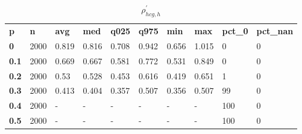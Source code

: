 \begin{table}[h]
 \centering 
\footnotesize
\caption{$\rho_{hcg,h}^\prime $}
\label{tab:alphahcgh}
\begin{tabular}[h]{| l l l l l l l l l l|
    } \hline
\textbf{ p} & \textbf{ n} & \textbf{ avg} & \textbf{ med} & \textbf{ q025} & \textbf{ q975} & \textbf{ min} & \textbf{ max} & \textbf{ pct\_0} & \textbf{ pct\_nan}
           \\
  \textbf{  0} & 2000 & 0.819 & 0.816 & 0.708 & 0.942 & 0.656 & 1.015 &   0 & 0
           \\
  \textbf{0.1} & 2000 & 0.669 & 0.667 & 0.581 & 0.772 & 0.531 & 0.849 &   0 & 0
           \\
  \textbf{0.2} & 2000 &  0.53 & 0.528 & 0.453 & 0.616 & 0.419 & 0.651 &   1 & 0
           \\
  \textbf{0.3} & 2000 & 0.413 & 0.404 & 0.357 & 0.507 & 0.356 & 0.507 &  99 & 0
           \\
  \textbf{0.4} & 2000 & - & - & - & - & - & - & 100 & 0
           \\
  \textbf{0.5} & 2000 & - & - & - & - & - & - & 100 & 0
           \\
 \hline \end{tabular}
 \end{table}
